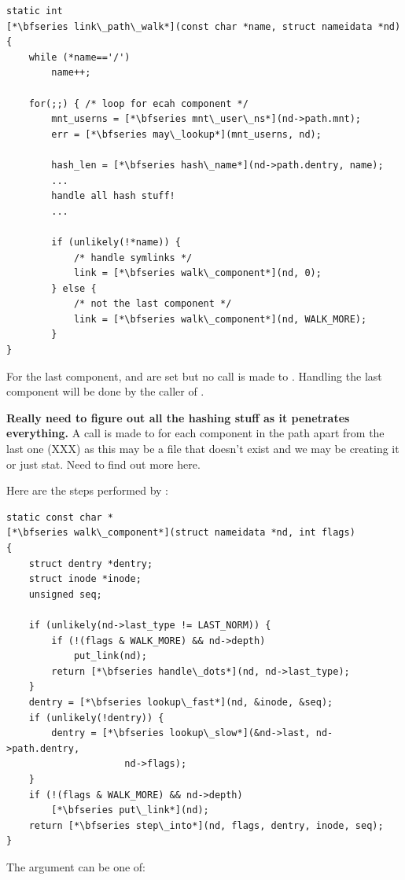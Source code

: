 \begin{lstlisting}
static int 
[*\bfseries link\_path\_walk*](const char *name, struct nameidata *nd)
{
    while (*name=='/')
        name++;

    for(;;) { /* loop for ecah component */
        mnt_userns = [*\bfseries mnt\_user\_ns*](nd->path.mnt);
        err = [*\bfseries may\_lookup*](mnt_userns, nd);

        hash_len = [*\bfseries hash\_name*](nd->path.dentry, name);
        ...
        handle all hash stuff!
        ...

        if (unlikely(!*name)) {
            /* handle symlinks */
            link = [*\bfseries walk\_component*](nd, 0);
        } else {
            /* not the last component */
            link = [*\bfseries walk\_component*](nd, WALK_MORE);
        }
}
\end{lstlisting}

\noindent
For the last component,  and  are set but no call is made to . Handling the last component will be done by the caller of .

\textbf{Really need to figure out all the hashing stuff as it penetrates everything.} A call is made to  for each component in the path apart from the last one (XXX) as this may be a file that doesn't exist and we may be creating it or just stat. Need to find out more here.

Here are the steps performed by :

\begin{lstlisting}
static const char *
[*\bfseries walk\_component*](struct nameidata *nd, int flags)
{       
    struct dentry *dentry;
    struct inode *inode;
    unsigned seq;

    if (unlikely(nd->last_type != LAST_NORM)) {
        if (!(flags & WALK_MORE) && nd->depth)
            put_link(nd);
        return [*\bfseries handle\_dots*](nd, nd->last_type);
    }       
    dentry = [*\bfseries lookup\_fast*](nd, &inode, &seq);
    if (unlikely(!dentry)) {
        dentry = [*\bfseries lookup\_slow*](&nd->last, nd->path.dentry, 
                     nd->flags);
    }
    if (!(flags & WALK_MORE) && nd->depth)
        [*\bfseries put\_link*](nd);
    return [*\bfseries step\_into*](nd, flags, dentry, inode, seq);
}
\end{lstlisting}

\noindent
The  argument can be one of:


